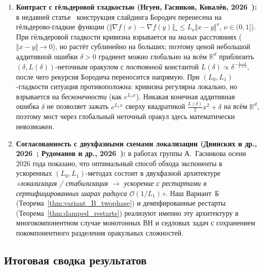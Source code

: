 \documentclass[11pt, a4paper]{article}
\theoremstyle{definition}
\begin{document}
\begin{enumerate}
    \item \textbf{Контраст с гёльдеровой гладкостью (Нгуен, Гасников, Ковалёв, 2026~\cite{Nguyen2026Holder}):} в недавней статье~\cite{Nguyen2026Holder} конструкция слайдинга Бородич перенесена на гёльдерово-гладкие функции ($\Vert \nabla f(x) - \nabla f(y) \Vert_* \le L_\nu \Vert x - y \Vert^\nu$, $\nu \in (0, 1]$). При гёльдеровой гладкости кривизна взрывается на \emph{малых} расстояниях ($\Vert x - y \Vert \to 0$), но растёт сублинейно на больших; поэтому ценой небольшой аддитивной ошибки $\delta > 0$ градиент можно глобально на всём $\mathbb{R}^d$ приблизить $(\delta, L(\delta))$-неточным оракулом с \emph{постоянной} константой $L(\delta) \propto \delta^{-\frac{1-\nu}{1+\nu}}$, после чего рекурсия Бородича переносится напрямую. При $(L_0, L_1)$-гладкости ситуация противоположна: кривизна регулярна локально, но взрывается на \emph{бесконечности} (как $e^{L_1 x}$). Никакая конечная аддитивная ошибка $\delta$ не позволяет зажать $e^{L_1 x}$ сверху квадратикой $\frac{L(\delta)}{2} x^2 + \delta$ на всём $\mathbb{R}^d$, поэтому мост через глобальный неточный оракул здесь математически невозможен.
    \item \textbf{Согласованность с двухфазными схемами локализации (Двинских и др., 2026~\cite{Dvinskikh2026}; Рудоманов и др., 2026~\cite{Rudomanov2026a, Rudomanov2026b}):} в работах группы А.~Гасникова осени 2026 года показано, что оптимальный способ обхода экспоненты в ускоренных $(L_0, L_1)$-методах состоит в двухфазной архитектуре \emph{«локализация / стабилизация $\to$ ускорение с рестартами в сертифицированных шарах радиуса $\mathcal{O}(1/L_1)$»}. Наш Вариант~Б (Теорема~\ref{thm:variant_B_twophase}) и демпфированные рестарты (Теорема~\ref{thm:damped_restarts}) реализуют именно эту архитектуру в многокомпонентном случае монотонных ВН и седловых задач с сохранением покомпонентного разделения оракульных сложностей.
\end{enumerate}

\subsection{Итоговая сводка результатов}
\end{document}
